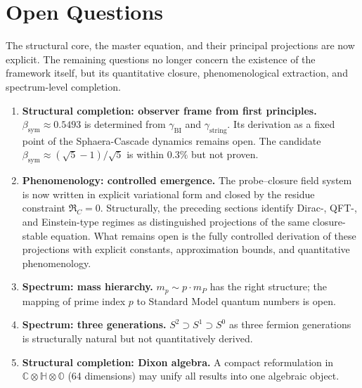 \documentclass[12pt,a4paper]{article}
\newcommand{\bsym}{\beta_{\mathrm{sym}}}
\newcommand{\gstring}{\gamma_{\mathrm{string}}}
\newcommand{\gBI}{\gamma_{\mathrm{BI}}}
\newcommand{\HH}{\mathbb{H}}
\newcommand{\OO}{\mathbb{O}}
\begin{document}

\section*{Open Questions}

The structural core, the master equation, and their principal projections are
now explicit. The remaining questions no longer concern the existence of the
framework itself, but its quantitative closure, phenomenological extraction,
and spectrum-level completion.

\begin{enumerate}
  \item \textbf{Structural completion: observer frame from first principles.}
        $\bsym\approx 0.5493$ is determined from $\gBI$ and $\gstring$.
        Its derivation as a fixed point of the Sphaera-Cascade dynamics
        remains open.
        The candidate $\bsym\approx(\sqrt{5}-1)/\sqrt{5}$ is within
        $0.3\%$ but not proven.

  \item \textbf{Phenomenology: controlled emergence.}
        The probe--closure field system is now written in explicit
        variational form and closed by the residue constraint
        $\mathfrak R_C=0$.
        Structurally, the preceding sections identify Dirac-, QFT-, and
        Einstein-type regimes as distinguished projections of the same
        closure-stable equation. What remains open is the fully controlled
        derivation of these projections with explicit constants,
        approximation bounds, and quantitative phenomenology.

  \item \textbf{Spectrum: mass hierarchy.}
        $m_p\sim p\cdot m_P$ has the right structure; the mapping of
        prime index $p$ to Standard Model quantum numbers is open.

  \item \textbf{Spectrum: three generations.}
        $S^2\supset S^1\supset S^0$ as three fermion generations is
        structurally natural but not quantitatively derived.

  \item \textbf{Structural completion: Dixon algebra.}
        A compact reformulation in
        $\mathbb{C}\otimes\HH\otimes\OO$ (64 dimensions) may unify
        all results into one algebraic object.


\end{enumerate}
\end{document}
